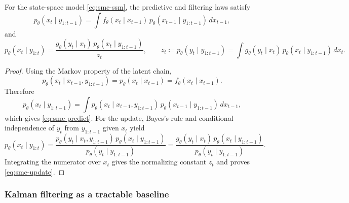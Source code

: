 \begin{proposition}
\label{prop:smc-filtering-recursion}
For the state-space model \eqref{eq:smc-ssm}, the predictive and filtering laws satisfy
\begin{equation}
  p_\theta(x_t \mid y_{1:t-1})
  =
  \int f_\theta(x_t \mid x_{t-1})\,p_\theta(x_{t-1} \mid y_{1:t-1})\,dx_{t-1},
  \label{eq:smc-predict}
\end{equation}
and
\begin{equation}
  p_\theta(x_t \mid y_{1:t})
  =
  \frac{g_\theta(y_t \mid x_t)\,p_\theta(x_t \mid y_{1:t-1})}{z_t},
  \qquad
  z_t \coloneqq p_\theta(y_t \mid y_{1:t-1})
  =
  \int g_\theta(y_t \mid x_t)\,p_\theta(x_t \mid y_{1:t-1})\,dx_t.
  \label{eq:smc-update}
\end{equation}
\end{proposition}
\begin{proof}
Using the Markov property of the latent chain,
\[
  p_\theta(x_t \mid x_{t-1},y_{1:t-1}) = p_\theta(x_t \mid x_{t-1}) = f_\theta(x_t \mid x_{t-1}).
\]
Therefore
\[
  p_\theta(x_t \mid y_{1:t-1})
  =
  \int p_\theta(x_t \mid x_{t-1},y_{1:t-1})\,p_\theta(x_{t-1} \mid y_{1:t-1})\,dx_{t-1},
\]
which gives \eqref{eq:smc-predict}.
For the update, Bayes's rule and conditional independence of $y_t$ from $y_{1:t-1}$ given $x_t$ yield
\[
  p_\theta(x_t \mid y_{1:t})
  =
  \frac{p_\theta(y_t \mid x_t,y_{1:t-1})\,p_\theta(x_t \mid y_{1:t-1})}{p_\theta(y_t \mid y_{1:t-1})}
  =
  \frac{g_\theta(y_t \mid x_t)\,p_\theta(x_t \mid y_{1:t-1})}{p_\theta(y_t \mid y_{1:t-1})}.
\]
Integrating the numerator over $x_t$ gives the normalizing constant $z_t$ and proves \eqref{eq:smc-update}.%
\end{proof}

\subsubsection{Kalman filtering as a tractable baseline}
\label{subsubsec:smc-kalman}

